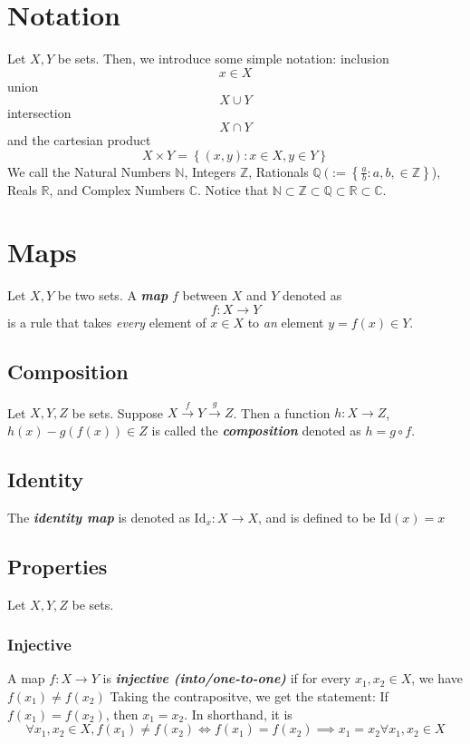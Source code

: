 \documentclass{article}
\newcommand{\Z}{\mathbb{Z}}
\newcommand{\N}{\mathbb{N}}
\newcommand{\textib}[1]{\textit{\textbf{{#1}}}}
\newcommand{\Id}{\text{Id}}
\begin{document}
\section{Notation}
Let $X, Y$ be sets. Then, we introduce some simple notation:
inclusion 
\[x \in X\]
union 
\[X \cup Y\]
intersection
\[X \cap Y\]
and the cartesian product 
\[X \times Y = \left\{ (x, y) : x \in X, y \in Y \right\}\]
\newline
We call the Natural Numbers $\N$, Integers $\Z$, Rationals 
$\mathbb{Q} \ (:= \left\{ \frac{a}{b} : a, b, \in  \Z \right\}$), Reals $\mathbb{R}$, 
and Complex Numbers $\mathbb{C}$. Notice that 
$\N \subset \Z \subset \mathbb{Q} \subset \mathbb{R} \subset \mathbb{C}$.



\section{Maps}
Let $X, Y$ be two sets. A \textib{map} $f$ between $X$ and $Y$ denoted as
\[f : X \to Y\]
is a rule that takes \textit{every} element of $x \in X$ to \textit{an} element $y = f(x) \in Y$.


\subsection{Composition}
Let $X, Y, Z$ be sets. Suppose $X \stackrel{f}{\to} Y \stackrel{g}{\to} Z$. Then a function
$h : X \to Z$, $h(x) - g(f(x)) \in Z$ is called the \textib{composition} denoted as $h = g \circ f$.


\subsection{Identity}
The \textib{identity map} is denoted as $\Id_x : X \to X$, and is defined to be $\Id(x) = x$


\subsection{Properties}
Let $X, Y, Z$ be sets.
\subsubsection{Injective}
A map $f : X \to Y$ is \textib{injective (into/one-to-one)} if for every $x_1, x_2 \in X$, we have
$f(x_1) \neq f(x_2)$ Taking the contrapositve, we get the statement: 
If $f(x_1) = f(x_2)$, then $x_1 = x_2$. In shorthand, it is
\[\forall x_1, x_2 \in X, f(x_1) \neq f(x_2) \iff f(x_1) = f(x_2) \implies x_1 = x_2 \forall x_1, x_2 \in X\]
\end{document}
